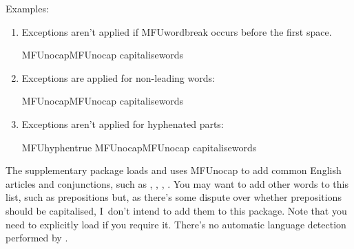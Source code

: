 \documentclass[titlepage=false,oneside,
 fontsize=12pt,captions=tableheading]{scrbook}
\begin{document}
Examples:
\begin{enumerate}
\item
Exceptions aren't applied if \gls{MFUwordbreak} occurs before the
first space.
\begin{codebox}
\gls{MFUnocap}\gls{MFUnocap}\comment{}
\gls{capitalisewords}
\end{codebox}
\begin{resultbox}
%
\end{resultbox}

\item
Exceptions are applied for non-leading words:
\begin{codebox}
\gls{MFUnocap}\gls{MFUnocap}\comment{}
\gls{capitalisewords}
\end{codebox}
\begin{resultbox}
%
\end{resultbox}

\item
Exceptions aren't applied for hyphenated parts:
\begin{codebox}
\gls{MFUhyphentrue}
\gls{MFUnocap}\gls{MFUnocap}\comment{}
\gls{capitalisewords}
\end{codebox}
\begin{resultbox}
\MFUhyphentrue
{}%
\end{resultbox}
\end{enumerate}

The supplementary package  loads  and uses
\gls{MFUnocap} to add common English articles and conjunctions, such
as , , , . You may want to add other
words to this list, such as prepositions but, as there's some
dispute over whether prepositions should be capitalised, I~don't
intend to add them to this package. Note that you need to explicitly
load  if you require it. There's no automatic
language detection performed by .
\end{document}
